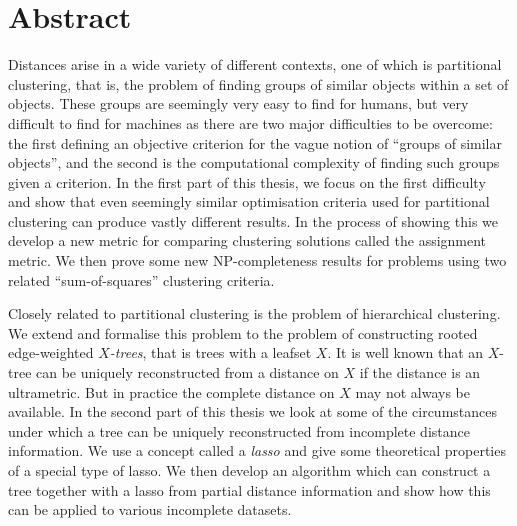 \chapter*{\centering Abstract}

Distances arise in a wide variety of different contexts, one of which is
partitional clustering, that is, the problem of finding groups of similar
objects within a set of objects.  These groups are seemingly very easy to find
for humans, but very difficult to find for machines as there are two major
difficulties to be overcome: the first defining an objective criterion for the
vague notion of ``groups of similar objects'', and the second is the
computational complexity of finding such groups given a criterion.  In the
first part of this thesis, we focus on the first difficulty and show that even
seemingly similar optimisation criteria used for partitional clustering can
produce vastly different results.  In the process of showing this we develop a
new metric for comparing clustering solutions called the assignment metric.
We then prove some new NP-completeness results for problems using two related
``sum-of-squares'' clustering criteria.

Closely related to partitional clustering is the problem of hierarchical
clustering.  We extend and formalise this problem to the problem of
constructing rooted edge-weighted \textit{$X$-trees}, that is trees with a
leafset $X$. It is well known that an $X$-tree can be uniquely reconstructed
from a distance on $X$ if the distance is an ultrametric.  But in practice the
complete distance on $X$ may not always be available.  In the second part of
this thesis we look at some of the circumstances under which a tree can be
uniquely reconstructed from incomplete distance information.  We use a concept
called a \textit{lasso} and give some theoretical properties of a special type
of lasso.  We then develop an algorithm which can construct a tree together
with a lasso from partial distance information and show how this can be
applied to various incomplete datasets.
